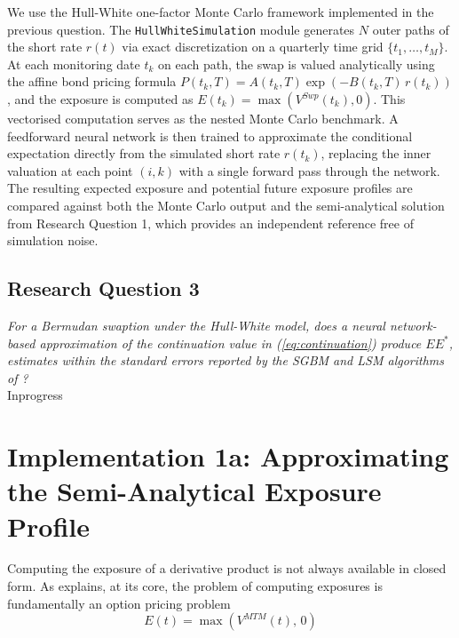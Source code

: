     \noindent
    We use the Hull-White one-factor Monte Carlo framework implemented in the previous question. The \texttt{HullWhiteSimulation} module generates $N$ outer paths of the short rate $r(t)$ via
    exact discretization on a quarterly time grid $\{t_1, \ldots, t_M\}$. At each monitoring date $t_k$ on each path, the swap is valued analytically using the affine
    bond pricing formula $P(t_k, T) = A(t_k, T)\exp(-B(t_k, T)\,r(t_k))$, and the exposure is computed as $E(t_k) = \max(V^{Swp}(t_k), 0)$. This vectorised computation serves as the nested
    Monte Carlo benchmark. A feedforward neural network is then trained to approximate the conditional expectation directly from the simulated short rate $r(t_k)$,
    replacing the inner valuation at each point $(i, k)$ with a single forward pass through the network. The resulting expected exposure and potential future exposure profiles are compared
    against both the Monte Carlo output and the semi-analytical solution from Research Question 1, which provides an independent reference free of simulation noise.
    
    \subsection*{Research Question 3}
    
    \textit{For a Bermudan swaption under the Hull-White model, does a neural network-based approximation of the continuation value in (\ref{eq:continuation}) produce $EE^{*}$, estimates within the standard errors reported by the SGBM and LSM algorithms of \cite{feng2016efficient}?}\\

    Inprogress

    \newpage    
\newpage                                                                                                                                                                                    
  \section{Implementation 1a: Approximating the Semi-Analytical Exposure Profile}\label{sec:model1a}                                                                                       
  Computing the exposure of a derivative product is not always available in closed form. As \cite{Gregory_2015} explains, at its core, the problem of computing exposures is fundamentally an option pricing problem                                                                                                                                                                     
  \begin{equation}
      E(t) = \max(V^{MTM}(t),\, 0)
  \end{equation}                                                                                                                                                                              


